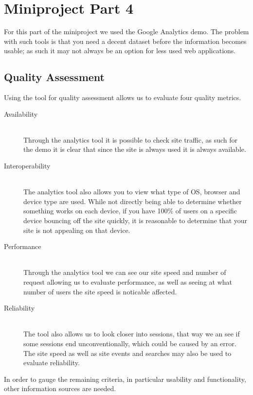 \chapter{Miniproject Part 4}
For this part of the miniproject we used the Google Analytics demo.
The problem with such tools is that you need a decent dataset before the information becomes usable; as such it may not always be an option for less used web applications.

\section{Quality Assessment}
Using the tool for quality assessment allows us to evaluate four quality metrics.
\begin{description}
	\item [Availability] \hfill \\ 
	Through the analytics tool it is possible to check site traffic, as such for the demo it is clear that since the site is always used it is always available. 
	\item [Interoperability] \hfill \\ 
	The analytics tool also allows you to view what type of  OS, browser and device type are used.
	While not directly being able to determine whether something works on each device, if you have 100\% of users on a specific device bouncing off the site quickly, it is reasonable to determine that your site is not appealing on that device.
	\item [Performance] \hfill \\ 
	Through the analytics tool we can see our site speed and number of request allowing us to evaluate performance, as well as seeing at what number of users the site speed is noticable affected.
	\item [Reliability] \hfill \\ 
	The tool also allows us to look closer into sessions, that way we an see if some sessions end unconventionally, which could be caused by an error. The site speed as well as site events and searches may also be used to evaluate reliability.
\end{description}

In order to gauge the remaining criteria, in particular usability and functionality, other information sources are needed.

